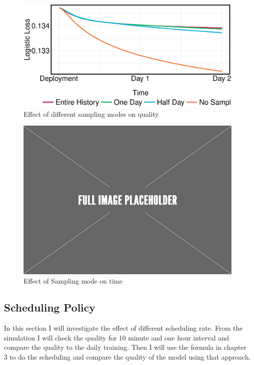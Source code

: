 \begin{figure}[h!]
\centering
\includegraphics[width=\columnwidth]{../images/experiment-results/criteo-sampling-mode-experiments.eps}
\caption{Effect of different sampling modes on quality}
\label{fig:sampling-mode-quality}
\vspace{2mm}
\end{figure}

\begin{figure}[h!]
\centering
\includegraphics[width=\columnwidth]{../images/placeholder.jpeg}
\caption{Effect of Sampling mode on time}
\label{fig:sampling-mode-time}
\vspace{2mm}
\end{figure}



\subsection{Scheduling Policy}
In this section I will investigate the effect of different scheduling rate.
From the simulation I will check the quality for 10 minute and one hour interval and compare the quality to the daily training.
Then I will use the formula in chapter 3 to do the scheduling and compare the quality of the model using that approach.

